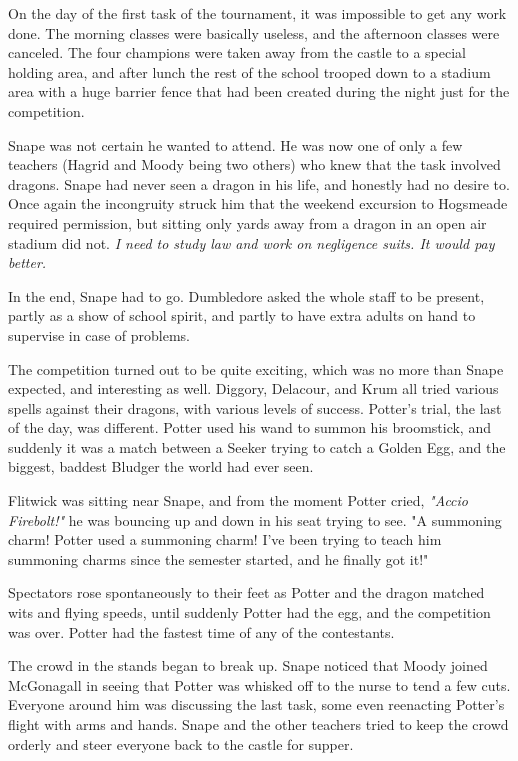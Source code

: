 \documentclass[a4paper,11pt]{article}
\begin{document}
On the day of the first task of the tournament, it was impossible to get any work done. The morning classes were basically useless, and the afternoon classes were canceled. The four champions were taken away from the castle to a special holding area, and after lunch the rest of the school trooped down to a stadium area with a huge barrier fence that had been created during the night just for the competition.

Snape was not certain he wanted to attend. He was now one of only a few teachers (Hagrid and Moody being two others) who knew that the task involved dragons. Snape had never seen a dragon in his life, and honestly had no desire to. Once again the incongruity struck him that the weekend excursion to Hogsmeade required permission, but sitting only yards away from a dragon in an open air stadium did not. \emph{I need to study law and work on negligence suits. It would pay better.}

In the end, Snape had to go. Dumbledore asked the whole staff to be present, partly as a show of school spirit, and partly to have extra adults on hand to supervise in case of problems.

The competition turned out to be quite exciting, which was no more than Snape expected, and interesting as well. Diggory, Delacour, and Krum all tried various spells against their dragons, with various levels of success. Potter's trial, the last of the day, was different. Potter used his wand to summon his broomstick, and suddenly it was a match between a Seeker trying to catch a Golden Egg, and the biggest, baddest Bludger the world had ever seen.

Flitwick was sitting near Snape, and from the moment Potter cried, \emph{"Accio Firebolt!"} he was bouncing up and down in his seat trying to see. "A summoning charm! Potter used a summoning charm! I've been trying to teach him summoning charms since the semester started, and he finally got it!"

Spectators rose spontaneously to their feet as Potter and the dragon matched wits and flying speeds, until suddenly Potter had the egg, and the competition was over. Potter had the fastest time of any of the contestants.

The crowd in the stands began to break up. Snape noticed that Moody joined McGonagall in seeing that Potter was whisked off to the nurse to tend a few cuts. Everyone around him was discussing the last task, some even reenacting Potter's flight with arms and hands. Snape and the other teachers tried to keep the crowd orderly and steer everyone back to the castle for supper.
\end{document}
